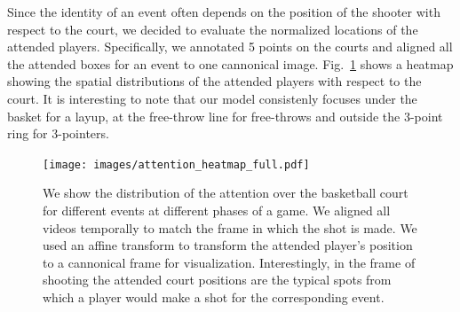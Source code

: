Since the identity of an event often depends on the position of the
shooter with respect to the court, we decided to evaluate the
normalized locations of the attended players.
Specifically, we annotated 5 points on the courts and
aligned all the attended boxes for an event to one cannonical image. 
Fig.~\ref{fig:att_heatmap} shows a heatmap  showing the spatial distributions
of the attended players with respect to the court. It is interesting to note that
our model consistenly focuses under the basket for a layup, at the free-throw
line for free-throws and outside the 3-point ring for 3-pointers.



\begin{figure}[t!]
\begin{center}
  \texttt{[image: images/attention\_heatmap\_full.pdf]}
\end{center}
   \caption{We show the distribution of the attention over the basketball court
     for different events at different phases of a game.  We aligned all videos
     temporally to match the frame in which the shot is made.  We used an
     affine transform to transform the attended player's position to a
     cannonical frame for visualization.  Interestingly, in the frame of
     shooting the attended court positions are the typical spots from which a
     player would make a shot for the corresponding event.
   }
\label{fig:att_heatmap}
\end{figure}


